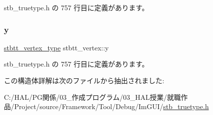  stb\+\_\+truetype.\+h の 757 行目に定義があります。

\mbox{\label{structstbtt__vertex_a9052065ca544b63d537325b246928cfc}} 
\subsubsection{\texorpdfstring{y}{y}}
{\footnotesize\ttfamily \mbox{\hyperlink{stb__truetype_8h_ab8fd8e5e0b82b0f7da54532035e47b22}{stbtt\+\_\+vertex\+\_\+type}} stbtt\+\_\+vertex\+::y}



 stb\+\_\+truetype.\+h の 757 行目に定義があります。



この構造体詳解は次のファイルから抽出されました\+:\begin{DoxyCompactItemize}
\item 
C\+:/\+H\+A\+L/\+P\+G関係/03\+\_\+作成プログラム/03\+\_\+\+H\+A\+L授業/就職作品/\+Project/source/\+Framework/\+Tool/\+Debug/\+Im\+G\+U\+I/\mbox{\hyperlink{stb__truetype_8h}{stb\+\_\+truetype.\+h}}\end{DoxyCompactItemize}
